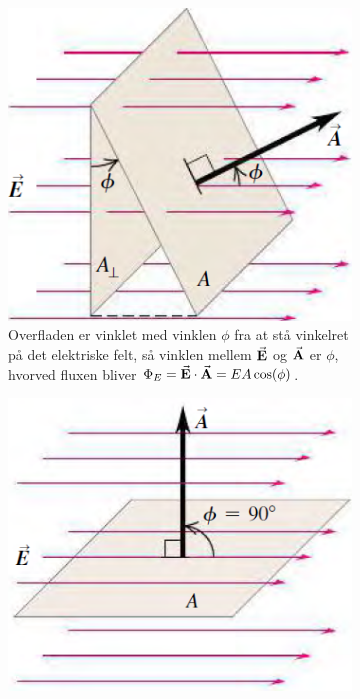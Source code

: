 \begin{figure}[h!]
\begin{subfigure}[t]{.3\textwidth}
        \centering
        \includegraphics[width=\columnwidth]{Elektro/Figurer/ElectricFlux2.PNG}
        \caption{Overfladen er vinklet med vinklen $\phi$ fra at stå vinkelret på det elektriske felt, så vinklen mellem $\va{E}$ og $\va{A}$ er $\phi$, hvorved fluxen bliver $\Phi_E = \va{E} \cdot \va{A} = EA\cos(\phi)$.}
        \label{fig:ElectricFlux2}
    \end{subfigure}
    \hfill
    \begin{subfigure}[t]{.3\textwidth}
        \centering
        \includegraphics[width=\columnwidth]{Elektro/Figurer/ElectricFlux3.PNG}

\end{subfigure}
\end{figure}
